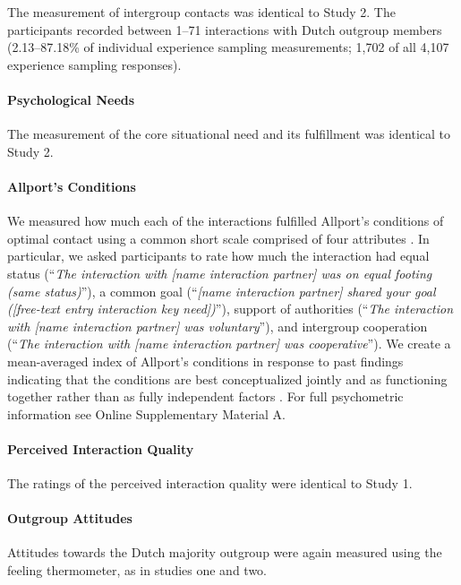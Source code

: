 \documentclass[man, 12pt, a4paper, mask]{apa7}
\theoremstyle{break}
\theoremstyle{plain}
\begin{document}
The measurement of intergroup contacts was identical to Study 2. The
participants recorded between 1--71 interactions with Dutch outgroup
members (2.13--87.18\% of individual experience sampling measurements;
1,702 of all 4,107 experience sampling responses).

\paragraph{Psychological Needs}

The measurement of the core situational need and its fulfillment was
identical to Study 2.

\paragraph{Allport's Conditions}

We measured how much each of the interactions fulfilled Allport's
conditions of optimal contact using a common short scale comprised of
four attributes \citep{Islam1993, Voci2003, AlRamiah2012a}. In
particular, we asked participants to rate how much the interaction had
equal status
(``\textit{The interaction with [name interaction partner] was on equal footing (same status)}''),
a common goal
(``\textit{[name interaction partner] shared your goal ([free-text entry interaction key need])}''),
support of authorities
(``\textit{The interaction with [name interaction partner] was voluntary}''),
and intergroup cooperation
(``\textit{The interaction with [name interaction partner] was cooperative}'').
We create a mean-averaged index of Allport's conditions in response to
past findings indicating that the conditions are best conceptualized
jointly and as functioning together rather than as fully independent
factors \citep[][, p. 766]{Pettigrew2006}. For full psychometric
information see Online Supplementary Material A.

\paragraph{Perceived Interaction Quality}

The ratings of the perceived interaction quality were identical to Study
1.

\paragraph{Outgroup Attitudes}

Attitudes towards the Dutch majority outgroup were again measured using
the feeling thermometer, as in studies one and two.
\end{document}
